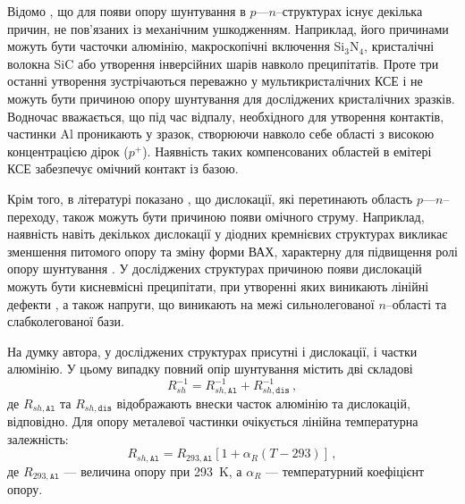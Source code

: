 Відомо \cite{Rsh:Breitenstein,RshMet,Breitenstein2013}, що для появи  опору шунтування в $p$---$n$--структурах існує декілька причин, не
пов'язаних із механічним ушкодженням.
Наприклад, його причинами  можуть бути часточки алюмінію, макроскопічні включення Si$_3$N$_4$, кристалічні волокна SiC або утворення інверсійних шарів
навколо преципітатів.
Проте три  останні утворення зустрічаються переважно у мультикристалічних КСЕ \cite{Rsh:Breitenstein,Breitenstein2013} і не можуть
бути причиною  опору шунтування для досліджених кристалічних зразків.
Водночас вважається, що під час відпалу, необхідного для утворення контактів, частинки Al проникають у зразок,
створюючи навколо себе області з високою концентрацією дірок ($p^+$).
Наявність таких компенсованих областей в емітері КСЕ  забезпечує омічний контакт із базою.

Крім того, в літературі показано \cite{Rsh:Breitenstein,TAT:Gopal,Rsh:Baker,Si:dislIV},
що дислокації, які перетинають область $p$---$n$--переходу, також можуть бути причиною появи омічного струму.
Наприклад, наявність навіть декількох дислокації у діодних кремнієвих структурах викликає зменшення питомого опору
та зміну форми ВАХ, характерну для підвищення ролі  опору  шунтування \cite{Si:dislIV}.
У досліджених структурах причиною появи дислокацій можуть бути кисневмісні преципітати, при утворенні яких
виникають лінійні дефекти \cite{SiO:Hwang,SiO:Vanhell}, а також напруги, що виникають
на межі сильнолегованої $n$--області та слабколегованої бази.

На думку автора, у досліджених структурах присутні і дислокації, і частки алюмінію.
У цьому випадку повний  опір шунтування містить дві складові
\begin{equation}
\label{eqRshFull}
R_{sh}^{-1}=R_{sh,\mathtt{Al}}^{-1}+R_{sh,\mathtt{dis}}^{-1}\,,
\end{equation}
де
$R_{sh,\mathtt{Al}}$ та $R_{sh,\mathtt{dis}}$ відображають внески часток алюмінію та дислокацій, відповідно.
Для опору металевої частинки очікується лінійна температурна залежність:
\begin{equation}
\label{eqRshAl}
R_{sh,\mathtt{Al}}=R_{293,\mathtt{Al}}[1+\alpha_R(T-293)]\,,
\end{equation}
де
$R_{293,\mathtt{Al}}$ --- величина  опору при 293~K,
а
$\alpha_R$ --- температурний коефіцієнт опору.

